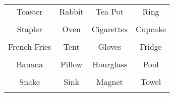 \documentclass[12pt,a4paper]{article}
\begin{document}
\thispagestyle{empty}
\begin{table}[]
\centering
\Huge
\begin{tabular}{cccc}
 Toaster& Rabbit& Tea Pot& Ring\\  & & & \\
 Stapler& Oven& Cigarettes& Cupcake\\  & & & \\
 French Fries& Tent& Gloves& Fridge\\  & & & \\
 Banana& Pillow& Hourglass& Pool\\  & & & \\
 Snake& Sink& Magnet& Towel\\  & & & \\
\end{tabular}
\end{table}
\end{document}
